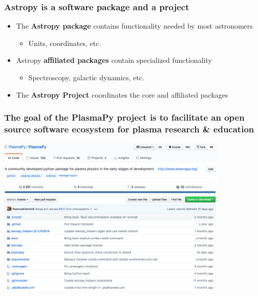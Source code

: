 \documentclass[default,compress]{beamer}
\begin{document}
\begin{frame}[plain]
    \frametitle{Astropy is a software package and a project}
    \begin{itemize}
    \item The \textbf{Astropy package} contains functionality needed by most astronomers
        \begin{itemize}
        \item Units, coordinates, etc.
        \end{itemize}
    \item Astropy \textbf{affiliated packages} contain specialized functionality
        \begin{itemize}
        \item Spectroscopy, galactic dynamics, etc.
        \end{itemize}
    \item The \textbf{Astropy Project} coordinates the core and affiliated packages
    \end{itemize}
    \vspace{2mm}
    \begin{center}
    \end{center}
\end{frame}


\begin{frame}[plain]
    \frametitle{The goal of the PlasmaPy project is to facilitate an open source software ecosystem for plasma research \& education}
    \begin{center}
        \includegraphics[width=11.0cm]{PlasmaPy_mainpage.png}
    \end{center}
\end{frame}
\end{document}
